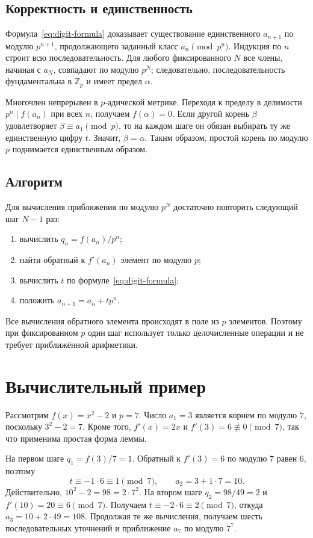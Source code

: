 \documentclass{misisarticle}
\begin{document}
\subsection{Корректность и единственность}

Формула~\eqref{eq:digit-formula} доказывает существование единственного $a_{n+1}$ по модулю $p^{n+1}$, продолжающего заданный класс $a_n\pmod {p^n}$. Индукция по $n$ строит всю последовательность. Для любого фиксированного $N$ все члены, начиная с $a_N$, совпадают по модулю $p^N$; следовательно, последовательность фундаментальна в $\mathbb Z_p$ и имеет предел $\alpha$.

Многочлен непрерывен в $p$-адической метрике. Переходя к пределу в делимости $p^n\mid f(a_n)$ при всех $n$, получаем $f(\alpha)=0$. Если другой корень $\beta$ удовлетворяет $\beta\equiv a_1\pmod p$, то на каждом шаге он обязан выбирать ту же единственную цифру $t$. Значит, $\beta=\alpha$. Таким образом, простой корень по модулю $p$ поднимается единственным образом.

\subsection{Алгоритм}

Для вычисления приближения по модулю $p^N$ достаточно повторить следующий шаг $N-1$ раз:
\begin{enumerate}
  \item вычислить $q_n=f(a_n)/p^n$;
  \item найти обратный к $f'(a_n)$ элемент по модулю $p$;
  \item вычислить $t$ по формуле~\eqref{eq:digit-formula};
  \item положить $a_{n+1}=a_n+t p^n$.
\end{enumerate}

Все вычисления обратного элемента происходят в поле из $p$ элементов. Поэтому при фиксированном $p$ один шаг использует только целочисленные операции и не требует приближённой арифметики.

\section{Вычислительный пример}

Рассмотрим $f(x)=x^2-2$ и $p=7$. Число $a_1=3$ является корнем по модулю $7$, поскольку $3^2-2=7$. Кроме того, $f'(x)=2x$ и $f'(3)=6\not\equiv0\pmod7$, так что применима простая форма леммы.

На первом шаге $q_1=f(3)/7=1$. Обратный к $f'(3)=6$ по модулю $7$ равен $6$, поэтому
\[
  t\equiv-1\cdot6\equiv1\pmod7,
  \qquad a_2=3+1\cdot7=10.
\]
Действительно, $10^2-2=98=2\cdot7^2$. На втором шаге $q_2=98/49=2$ и $f'(10)=20\equiv6\pmod7$. Получаем $t\equiv-2\cdot6\equiv2\pmod7$, откуда $a_3=10+2\cdot49=108$. Продолжая те же вычисления, получаем шесть последовательных уточнений и приближение $a_7$ по модулю $7^7$.
\end{document}
